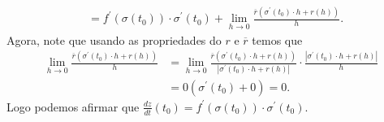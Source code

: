 \begin{homeworkProblem}[Seção 1-8]
\begin{solution}
\begin{align*}
      &=f^{\prime}(\sigma(t_0))\cdot\sigma^{\prime}(t_0)+\lim_{h \to 0}\frac{\overline{r}(\sigma^{\prime}(t_0)\cdot h+r(h))}{h}.
    \end{align*}
    Agora, note que usando as propriedades do $r$ e $\overline{r}$ temos que 
    \begin{align*}
      \lim_{h \to 0}\frac{\overline{r}(\sigma^{\prime}(t_0)\cdot h+r(h))}{h}&=\lim_{h \to 0}\frac{\overline{r}(\sigma^{\prime}(t_0)\cdot h+r(h))}{|\sigma^{\prime}(t_0)\cdot h+r(h)|}\cdot\frac{|\sigma^{\prime}(t_0)\cdot h+r(h)|}{h}\\
      &=0(\sigma^{\prime}(t_0)+0)=0.
    \end{align*}
    Logo podemos afirmar que $\displaystyle \frac{dz}{dt}(t_0)=f^{\prime}(\sigma(t_0))\cdot\sigma^{\prime}(t_0)$.
  \end{solution}
\end{homeworkProblem}
